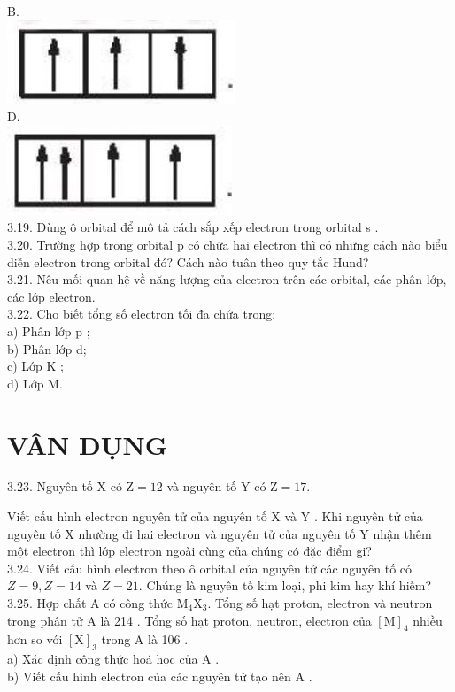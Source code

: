 \documentclass[10pt]{article}
\begin{document}
B.\\
\includegraphics[max width=\textwidth, center]{2025_10_23_daab5c8457c85b365b9eg-06(2)}\\
D.\\
\includegraphics[max width=\textwidth, center]{2025_10_23_daab5c8457c85b365b9eg-06}\\
3.19. Dùng ô orbital để mô tả cách sắp xếp electron trong orbital s .\\
3.20. Trường hợp trong orbital p có chứa hai electron thì có những cách nào biểu diễn electron trong orbital đó? Cách nào tuân theo quy tắc Hund?\\
3.21. Nêu mối quan hệ về năng lượng của electron trên các orbital, các phân lớp, các lớp electron.\\
3.22. Cho biết tổng số electron tối đa chứa trong:\\
a) Phân lớp p ;\\
b) Phân lớp d;\\
c) Lớp K ;\\
d) Lớp M.

\section*{VÂN DỤNG}
3.23. Nguyên tố X có $\mathrm{Z}=12$ và nguyên tố Y có $\mathrm{Z}=17$.

Viết cấu hình electron nguyên tử của nguyên tố X và Y . Khi nguyên tử của nguyên tố X nhường đi hai electron và nguyên tử của nguyên tố Y nhận thêm một electron thì lớp electron ngoài cùng của chúng có đặc điểm gi?\\
3.24. Viết cấu hình electron theo ô orbital của nguyên tử các nguyên tố có $Z=9, Z=14$ và $Z=21$. Chúng là nguyên tố kim loại, phi kim hay khí hiếm?\\
3.25. Hợp chất A có công thức $\mathrm{M}_{4} \mathrm{X}_{3}$. Tổng số hạt proton, electron và neutron trong phân tử A là 214 . Tổng số hạt proton, neutron, electron của $[\mathrm{M}]_{4}$ nhiều hơn so với $[\mathrm{X}]_{3}$ trong A là 106 .\\
a) Xác định công thức hoá học của A .\\
b) Viết cấu hình electron của các nguyên tử tạo nên A .
\end{document}
